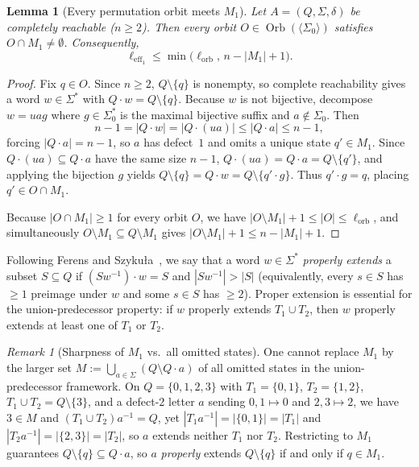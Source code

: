 \documentclass[11pt,a4paper]{article}
\newtheorem{lemma}[theorem]{Lemma}
\theoremstyle{definition}
\theoremstyle{remark}
\newtheorem{remark}[theorem]{Remark}
\newcommand{\Orb}{\operatorname{Orb}}
\newcommand{\leff}{\ell_{\mathrm{eff}_1}}
\newcommand{\lorb}{\ell_{\mathrm{orb}}}
\begin{document}
\begin{lemma}[Every permutation orbit meets $M_1$]\label{lem:orbit-meets-m1}
Let $A = (Q, \Sigma, \delta)$ be completely reachable ($n \ge 2$). Then every orbit $O \in \Orb(\langle \Sigma_0 \rangle)$ satisfies $O \cap M_1 \neq \emptyset$. Consequently,
\[
  \leff \le \min\bigl(\lorb,\, n - |M_1| + 1\bigr).
\]
\end{lemma}

\begin{proof}
Fix $q \in O$. Since $n \ge 2$, $Q \setminus \{q\}$ is nonempty, so complete reachability gives a word $w \in \Sigma^*$ with $Q \cdot w = Q \setminus \{q\}$. Because $w$ is not bijective, decompose $w = u a g$ where $g \in \Sigma_0^*$ is the maximal bijective suffix and $a \notin \Sigma_0$. Then
\[
  n - 1 = |Q \cdot w| = |Q \cdot (ua)| \le |Q \cdot a| \le n - 1,
\]
forcing $|Q \cdot a| = n - 1$, so $a$ has defect~$1$ and omits a unique state $q' \in M_1$. Since $Q \cdot (ua) \subseteq Q \cdot a$ have the same size $n - 1$, $Q \cdot (ua) = Q \cdot a = Q \setminus \{q'\}$, and applying the bijection $g$ yields $Q \setminus \{q\} = Q \cdot w = Q \setminus \{q' \cdot g\}$. Thus $q' \cdot g = q$, placing $q' \in O \cap M_1$.

Because $|O \cap M_1| \ge 1$ for every orbit $O$, we have $|O \setminus M_1| + 1 \le |O| \le \lorb$, and simultaneously $O \setminus M_1 \subseteq Q \setminus M_1$ gives $|O \setminus M_1| + 1 \le n - |M_1| + 1$.
\end{proof}

Following Ferens and Szyku\l a~\cite{FS2025}, we say that a word $w \in \Sigma^*$ \emph{properly extends} a subset $S \subseteq Q$ if $(S w^{-1}) \cdot w = S$ and $|S w^{-1}| > |S|$ (equivalently, every $s \in S$ has $\ge 1$ preimage under $w$ and some $s \in S$ has $\ge 2$). Proper extension is essential for the union-predecessor property: if $w$ properly extends $T_1 \cup T_2$, then $w$ properly extends at least one of $T_1$ or $T_2$.

\begin{remark}[Sharpness of $M_1$ vs.\ all omitted states]\label{rem:m1-sharp}
One cannot replace $M_1$ by the larger set $M := \bigcup_{a \in \Sigma} (Q \setminus Q \cdot a)$ of all omitted states in the union-predecessor framework. On $Q = \{0, 1, 2, 3\}$ with $T_1 = \{0, 1\}$, $T_2 = \{1, 2\}$, $T_1 \cup T_2 = Q \setminus \{3\}$, and a defect-$2$ letter $a$ sending $0, 1 \mapsto 0$ and $2, 3 \mapsto 2$, we have $3 \in M$ and $(T_1 \cup T_2) a^{-1} = Q$, yet $|T_1 a^{-1}| = |\{0, 1\}| = |T_1|$ and $|T_2 a^{-1}| = |\{2, 3\}| = |T_2|$, so $a$ extends neither $T_1$ nor $T_2$. Restricting to $M_1$ guarantees $Q \setminus \{q\} \subseteq Q \cdot a$, so $a$ \emph{properly} extends $Q \setminus \{q\}$ if and only if $q \in M_1$.
\end{remark}
\end{document}

